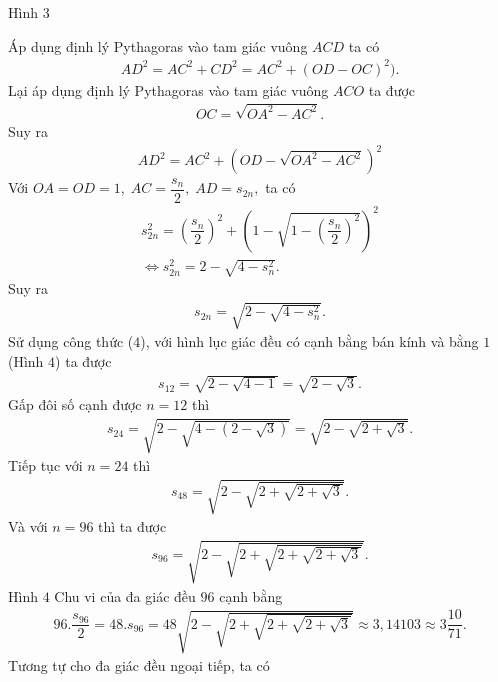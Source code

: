 \begin{multicols}{2}
	Hình $3$
	
	Áp dụng định lý Pythagoras vào tam giác vuông $ACD$  ta có
	\begin{align*}
		A{D^2} = A{C^2} + C{D^2} = A{C^2} + {(OD - OC)^2}).
	\end{align*}
	Lại áp dụng định lý Pythagoras vào tam giác vuông $ACO$  ta được
	\begin{align*}
		OC = \sqrt {O{A^2} - A{C^2}} .
	\end{align*}
	Suy ra 
	\begin{align*}
		A{D^2} = A{C^2} + {\left( {OD - \sqrt {O{A^2} - A{C^2}} } \right)^2}
	\end{align*}
	Với  $OA = OD = 1,\;AC = \dfrac{{{s_n}}}{2},\;AD = {s_{2n}},$ ta có
	\begin{align*}
		s_{2n}^2 = {\left( {\dfrac{{{s_n}}}{2}} \right)^2} + {\left( {1 - \sqrt {1 - {{\left( {\dfrac{{{s_n}}}{2}} \right)}^2}} } \right)^2}\\
		\Leftrightarrow s_{2n}^2 = 2 - \sqrt {4 - s_n^2}.
	\end{align*}
	Suy ra 
	\begin{align*}
		{s_{2n}} = \sqrt {2 - \sqrt {4 - s_n^2} }. \tag{$6$}
	\end{align*}
	Sử dụng công thức ($4$), với hình lục giác đều có cạnh bằng bán kính và bằng $1$ (Hình $4$) ta được 
	\begin{align*}
		{s_{12}} = \sqrt {2 - \sqrt {4 - 1} }  = \sqrt {2 - \sqrt 3 } .
	\end{align*}
	Gấp đôi số cạnh được $n= 12$ thì 
	\begin{align*}
		{s_{24}} = \sqrt {2 - \sqrt {4 - (2 - \sqrt 3 )} }  = \sqrt {2 - \sqrt {2 + \sqrt 3 } } .
	\end{align*}
	Tiếp tục với $n = 24$  thì 
	\begin{align*}
		{s_{48}} = \sqrt {2 - \sqrt {2 + \sqrt {2 + \sqrt 3 } } } .
	\end{align*}
	Và với $n = 96$ thì ta được 
	\begin{align*}
		{s_{96}} = \sqrt {2 - \sqrt {2 + \sqrt {2 + \sqrt {2 + \sqrt 3 } } } } .
	\end{align*}
	Hình $4$
	\vskip 0.1cm
	Chu vi của đa giác đều $96$ cạnh bằng
	\begin{align*}
		96.\dfrac{{{s_{96}}}}{2} = 48.{s_{96}} = 48\sqrt {2 - \sqrt {2 + \sqrt {2 + \sqrt {2 + \sqrt 3 } } } }  \approx 3,14103 \approx 3\dfrac{{10}}{{71}}.
	\end{align*}
	Tương tự cho đa giác đều ngoại tiếp, ta có 
	\begin{align*}

\end{align*}
\end{multicols}
